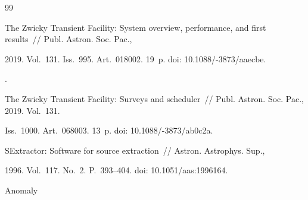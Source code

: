 












\renewcommand{\bibname}{\protect\rmfamily Литература}




{\small\frenchspacing

{%

\begin{thebibliography}{99}









The Zwicky Transient Facility: System overview, performance, and first results~/\!\!/ Publ. Astron. Soc. Pac., 

2019. Vol.~131. Iss.~995. Art.~018002. 19~p. doi: 10.1088\!/-3873/aaecbe.




.

{The Zwicky Transient Facility: Surveys and scheduler}~/\!\!/ Publ. Astron. Soc. Pac., 2019. Vol.~131. 

Iss.~1000. Art.~068003. 13~p. doi: 10.1088\!/-3873/ab0c2a.






 SExtractor: Software for source extraction~/\!\!/ Astron. Astrophys. Sup., 

1996. Vol.~117. No.~2. P.~393--404. doi: {10.1051\!/\!aas:1996164}.




 Anomaly 


\end{thebibliography}}}
